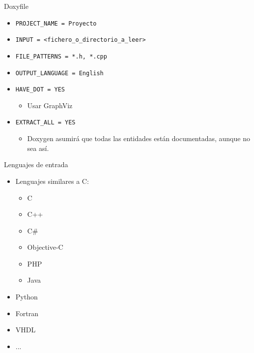 \documentclass[12pt,xcolor=svgnames]{beamer}
\begin{document}
\begin{frame}{Doxyfile}
  \begin{itemize}
  \item \texttt{PROJECT\_NAME = Proyecto}
  \item \texttt{INPUT = <fichero\_o\_directorio\_a\_leer>}
  \item \texttt{FILE\_PATTERNS = *.h, *.cpp}
  \item \texttt{OUTPUT\_LANGUAGE = English}
  \item \texttt{HAVE\_DOT = YES}
    \begin{itemize}
    \item  Usar GraphViz
    \end{itemize}
  \item \texttt{EXTRACT\_ALL = YES }
    \begin{itemize}
    \item Doxygen asumirá que todas las entidades están documentadas, aunque no
      sea así.
    \end{itemize}
  \end{itemize}
\end{frame}

\begin{frame}{Lenguajes de entrada}
  \begin{itemize}
  \item Lenguajes similares a C:
    \begin{itemize}
    \item C
    \item C++
    \item C\#
    \item Objective-C
    \item PHP
    \item Java
    \end{itemize}
  \item Python
  \item Fortran
  \item VHDL
  \item ...
  \end{itemize}
\end{frame}
\end{document}
